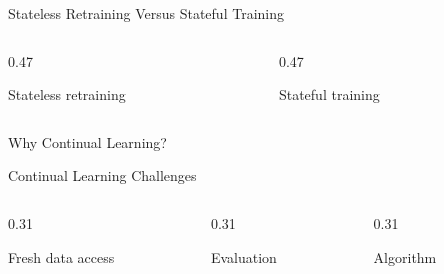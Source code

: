 \begin{frame}{Stateless Retraining Versus Stateful Training}
  \begin{columns}[T,onlytextwidth]
    \begin{column}{0.47\textwidth}
      \begin{tdblockt}[equal height group=state]{Stateless retraining}
      \end{tdblockt}
    \end{column}
    \begin{column}{0.47\textwidth}
      \begin{tdblockt}[equal height group=state]{Stateful training}
      \end{tdblockt}
    \end{column}
  \end{columns}
\end{frame}

\begin{frame}{Why Continual Learning?}
  \begin{withmargin}
    \begin{tdmain}
    \end{tdmain}
    \begin{tdmargin}
    \end{tdmargin}
  \end{withmargin}
\end{frame}

\begin{frame}{Continual Learning Challenges}
  \begin{columns}[T,onlytextwidth]
    \begin{column}{0.31\textwidth}
      \begin{tdblockt}[equal height group=chal]{Fresh data access}
      \end{tdblockt}
    \end{column}
    \begin{column}{0.31\textwidth}
      \begin{tdblockt}[equal height group=chal]{Evaluation}
      \end{tdblockt}
    \end{column}
    \begin{column}{0.31\textwidth}
      \begin{tdblockt}[equal height group=chal]{Algorithm}
      \end{tdblockt}
    \end{column}
  \end{columns}
\end{frame}

